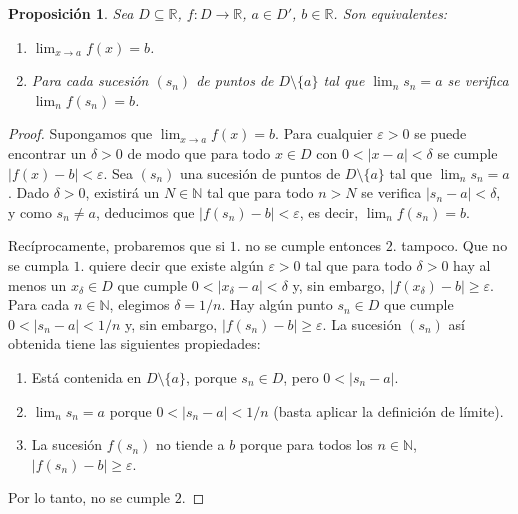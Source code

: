 \documentclass[12pt]{article}
\newtheorem{proposition}[theorem]{Proposición}
\begin{document}
\begin{proposition}Sea $D \subseteq \mathbb{R}$, $f \colon D \longrightarrow \mathbb{R}$, $a \in D'$, $b \in \mathbb{R}$. Son equivalentes: 
\begin{enumerate}
\item $\lim_{x\rightarrow a} f(x) = b$.
\item Para cada sucesión $(s_n)$ de puntos de $D \setminus \lbrace a \rbrace $ tal que $\lim_n s_n = a$ se verifica $\lim_nf(s_n) = b$.
\end{enumerate}
\end{proposition}
\begin{proof}
Supongamos que $\lim_{x \rightarrow a} f(x) = b$. Para cualquier $\varepsilon >0$ se puede encontrar un $\delta >0$ de modo que para todo $x \in D$ con $0 < |x-a|< \delta$ se cumple $|f(x) -b | < \varepsilon$. Sea $(s_n)$ una sucesión de puntos de $D \setminus \lbrace a \rbrace$ tal que $\lim_n s_n = a$. Dado $\delta >0$, existirá un $N \in \mathbb{N}$ tal que para todo $n > N$ se verifica $|s_n-a | < \delta$, y como $s_n \neq a$, deducimos que $|f(s_n) -b | < \varepsilon$, es decir, $\lim_n f(s_n) = b$.

Recíprocamente, probaremos que si $1.$ no se cumple entonces $2.$ tampoco. Que no se cumpla $1.$ quiere decir que existe algún $\varepsilon >0$ tal que para todo $\delta >0$ hay al menos un $x_\delta \in D$ que cumple $0 < |x_\delta - a | < \delta$ y, sin embargo, $|f(x_\delta)-b | \geq \varepsilon$.
Para cada $n \in \mathbb{N}$, elegimos $\delta = 1/n$. Hay algún punto $s_n \in D$ que cumple $0 < |s_n -a| < 1/n$ y, sin embargo, $|f(s_n)-b | \geq \varepsilon$. La sucesión $(s_n)$ así obtenida tiene las siguientes propiedades: 
\begin{enumerate}
\item Está contenida en $D \setminus \lbrace a \rbrace$, porque $s_n \in D$, pero $0< |s_n -a|$. 
\item $\lim_n s_n=a$ porque $0 < |s_n-a|<1/n$ (basta aplicar la definición de límite).
\item La sucesión $f(s_n)$ no tiende a $b$ porque para todos los $n \in \mathbb{N}$, $|f(s_n)-b| \geq \varepsilon$.
\end{enumerate}
Por lo tanto, no se cumple $2.$
\end{proof}
\end{document}
